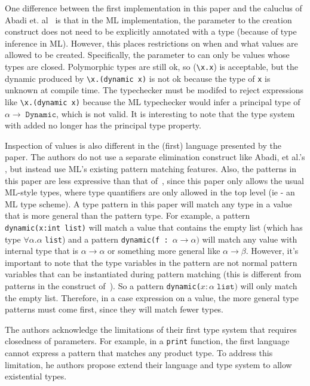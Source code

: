 \documentclass[12pt]{article}	%
\begin{document}
One difference between the first implementation in this paper and the caluclus of Abadi et. al~\cite{Abadi1991Dynamic,Abadi1995DynamicPolymorphic} is that in the ML implementation, the parameter to the \dynamic creation construct does not need to be explicitly annotated with a type (because of type inference in ML). However, this places restrictions on when and what \Dynamic values are allowed to be created. Specifically, the parameter to \dynamic can only be values whose types are closed. Polymorphic types are still ok, so (\dynamic \verb!\x.x!) is acceptable, but the dynamic produced by \verb!\x.(dynamic x)! is not ok because the type of \texttt{x} is unknown at compile time. The typechecker must be modifed to reject expressions like \verb!\x.(dynamic x)! because the ML typechecker would infer a principal type of $\alpha \rightarrow \; \mathtt{Dynamic}$, which is not valid. It is interesting to note that the type system with \Dynamic added no longer has the principal type property.

Inspection of \Dynamic values is also different in the (first) language presented by the paper. The authors do not use a separate elimination construct like Abadi, et al.'s \typecase, but instead use ML's existing pattern matching features.  Also, the patterns in this paper are less expressive than that of~\cite{Abadi1995DynamicPolymorphic}, since this paper only allows the usual ML-style types, where type quantifiers are only allowed in the top level (ie - an ML type scheme). A type pattern in this paper will match any type in a \Dynamic value that is more general than the pattern type. For example, a pattern \verb!dynamic(x:int list)! will match a \Dynamic value that contains the empty list (which has type $\forall \alpha.\alpha$ \verb!list!) and a pattern \verb!dynamic(f : !$\alpha \rightarrow \alpha)$ will match any \Dynamic value with internal type that is $\alpha \rightarrow \alpha$ or something more general like $\alpha \rightarrow \beta$. However, it's important to note that the type variables in the pattern are not normal pattern variables that can be instantiated during pattern matching (this is different from patterns in the \typecase construct of~\cite{Abadi1995DynamicPolymorphic}). So a pattern \verb!dynamic(!$x:\alpha \; \mathtt{list})$ will only match the empty list. Therefore, in a case expression on a \Dynamic value, the more general type patterns must come first, since they will match fewer types.

The authors acknowledge the limitations of their first type system that requires closedness of \dynamic parameters. For example, in a \texttt{print} function, the first language cannot express a pattern that matches any product type. To address this limitation, he authors propose extend their language and type system to allow existential types.
\end{document}

